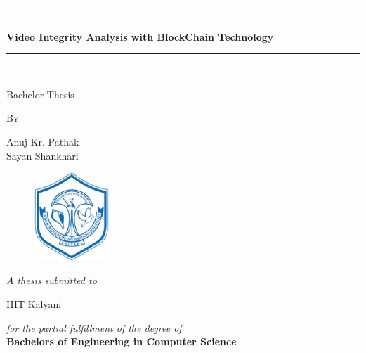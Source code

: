 \documentclass[a4paper,12pt]{report}
\newcommand{\HRule}{\rule{\linewidth}{0.5mm}}
\begin{document}
\begin{titlepage}
\begin{center}
\HRule \\[0.4cm]
{\huge \bfseries \textbf{Video Integrity Analysis with BlockChain Technology}  \\[0.4cm] }
\HRule \\[1cm]
\end{center}
\vspace{0.2cm}
\begin{center}
{\large{Bachelor Thesis}}
\end{center}
\vspace{0.25cm}
\begin{center}
{\large {\textsc{By}}}
\end{center}
\vspace{0.35cm}
\begin{center}
{\large{Anuj Kr. Pathak\\Sayan Shankhari}}
\end{center}
\vspace{0.25cm}

\begin{figure}[h]
    \centering
        \includegraphics[width=0.25\textwidth]{iiitk}
\end{figure}

\vspace{0.5cm}

\begin{center}
{\textit{\Large{A thesis submitted to}}}\\
\end{center}

\vspace{0.25cm}

\begin{center}
{\Large{IIIT Kalyani}}\\
\end{center}

\vspace{0.35cm}

\begin{center}
\textit{\large {for the partial fulfillment of the degree of}}\\
\vspace{0.8cm}
\textbf{\Large{Bachelors of Engineering in Computer Science}}\\
\end{center}


\end{titlepage}
\end{document}
